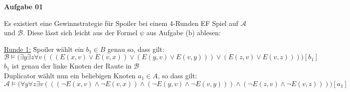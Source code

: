 \documentclass[a4paper,10pt]{article}
\begin{document}
	\parindent0pt
	\textbf{Aufgabe 01}
	\begin{compactenum} [(a)]
		\item Es existiert eine Gewinnstrategie für Spoiler bei einem 4-Runden EF Spiel auf $ \mathcal{A} $ und $ \mathcal{B} $. Diese lässt sich leicht aus der Formel $ \psi $ aus Aufgabe (b) ablesen:\\
		\begin{tabbing}
			\underline{Runde 1:} \= Spoiler wählt ein $ b_1 \in B $ genau so, dass gilt:\\
			\> $ \mathcal{B} \models \big(\exists y \exists z \forall v (((E(x,v)\vee E(v,x))\vee  (E(y,v)\vee E(v,y)))\vee (E(z,v)\vee E(v,z)))\big)[b_1] $ \\
			\> $ b_1 $ ist genau der linke Knoten der Raute in $ \mathcal{B} $ \\
			\> Duplicator wählt nun ein beliebigen Knoten $ a_1 \in A$, so dass gilt:\\
			\> $ \mathcal{A} \models \big(\forall y \forall z \exists v (((\lnot E(x,v)\wedge \lnot E(v,x))\wedge  (\lnot E(y,v)\wedge \lnot E(v,y)))\wedge (\lnot E(z,v)\wedge \lnot E(v,z)))\big) [a_1] $ \\
			

\end{tabbing}
\end{compactenum}
\end{document}
